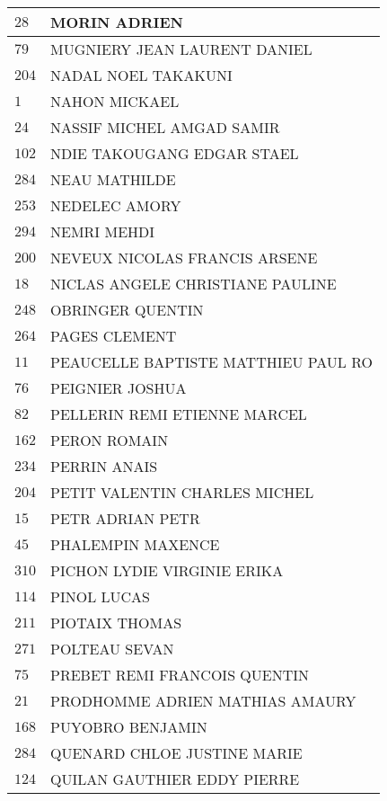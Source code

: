 \begin{xltabular}{\linewidth}{|l|X|}
    \hline
    $28$ & MORIN ADRIEN \\
    \hline
    $79$ & MUGNIERY JEAN LAURENT DANIEL \\
    \hline
    $204$ & NADAL NOEL TAKAKUNI \\
    \hline
    $1$ & NAHON MICKAEL \\
    \hline
    $24$ & NASSIF MICHEL AMGAD SAMIR \\
    \hline
    $102$ & NDIE TAKOUGANG EDGAR STAEL \\
    \hline
    $284$ & NEAU MATHILDE \\
    \hline
    $253$ & NEDELEC AMORY \\
    \hline
    $294$ & NEMRI MEHDI \\
    \hline
    $200$ & NEVEUX NICOLAS FRANCIS ARSENE \\
    \hline
    $18$ & NICLAS ANGELE CHRISTIANE PAULINE \\
    \hline
    $248$ & OBRINGER QUENTIN \\
    \hline
    $264$ & PAGES CLEMENT \\
    \hline
    $11$ & PEAUCELLE BAPTISTE MATTHIEU PAUL RO \\
    \hline
    $76$ & PEIGNIER JOSHUA \\
    \hline
    $82$ & PELLERIN REMI ETIENNE MARCEL \\
    \hline
    $162$ & PERON ROMAIN \\
    \hline
    $234$ & PERRIN ANAIS \\
    \hline
    $204$ & PETIT VALENTIN CHARLES MICHEL \\
    \hline
    $15$ & PETR ADRIAN PETR \\
    \hline
    $45$ & PHALEMPIN MAXENCE \\
    \hline
    $310$ & PICHON LYDIE VIRGINIE ERIKA \\
    \hline
    $114$ & PINOL LUCAS \\
    \hline
    $211$ & PIOTAIX THOMAS \\
    \hline
    $271$ & POLTEAU SEVAN \\
    \hline
    $75$ & PREBET REMI FRANCOIS QUENTIN \\
    \hline
    $21$ & PRODHOMME ADRIEN MATHIAS AMAURY \\
    \hline
    $168$ & PUYOBRO BENJAMIN \\
    \hline
    $284$ & QUENARD CHLOE JUSTINE MARIE \\
    \hline
    $124$ & QUILAN GAUTHIER EDDY PIERRE \\

\end{xltabular}
